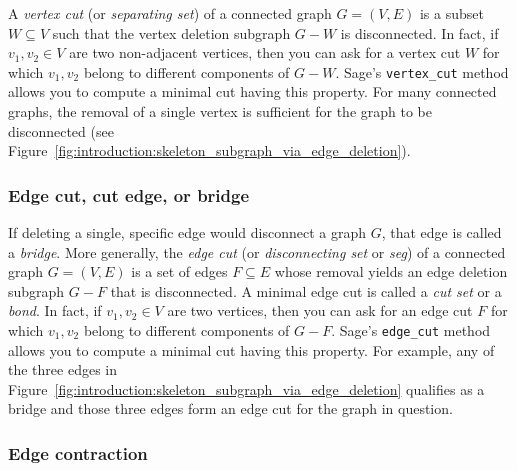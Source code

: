 A \emph{vertex cut} (or \emph{separating set}) of a connected graph
$G = (V, E)$ is a subset $W \subseteq V$ such that the vertex deletion
subgraph $G - W$ is disconnected. In fact, if $v_1, v_2 \in V$ are two
non-adjacent vertices, then you can ask for a vertex cut $W$ for which
$v_1, v_2$ belong to different components of $G - W$. Sage's
\verb!vertex_cut! method allows you to compute a minimal cut having
this property. For many connected graphs, the removal of a single
vertex is sufficient for the graph to be disconnected
(see Figure~\ref{fig:introduction:skeleton_subgraph_via_edge_deletion}).



\subsubsection{Edge cut, cut edge, or bridge}

If deleting a single, specific edge would disconnect a graph $G$, that
edge is called a \emph{bridge}. More generally, the \emph{edge cut}
(or \emph{disconnecting set} or \emph{seg}) of a connected graph
$G = (V, E)$ is a set of edges $F \subseteq E$ whose removal yields an
edge deletion subgraph $G - F$ that is disconnected. A minimal edge
cut is called a \emph{cut set} or a \emph{bond}.
In fact, if $v_1, v_2 \in V$ are two vertices, then you can ask for an
edge cut $F$ for which $v_1, v_2$ belong to different components of
$G - F$. Sage's \verb!edge_cut! method allows you to compute a minimal
cut having this property. For example, any of the three edges in
Figure~\ref{fig:introduction:skeleton_subgraph_via_edge_deletion}
qualifies as a bridge and those three edges form an edge cut for the
graph in question.



\subsubsection{Edge contraction}

